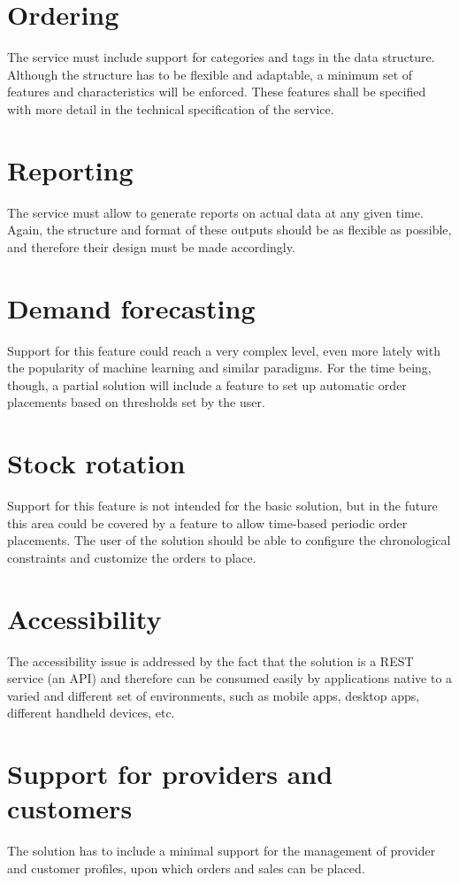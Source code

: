 \section{Ordering}
The service must include support for categories and tags in the data structure. Although the structure has to be flexible and adaptable, a minimum set of features and characteristics will be enforced. These features shall be specified with more detail in the technical specification of the service.
\section{Reporting}
The service must allow to generate reports on actual data at any given time. Again, the structure and format of these outputs should be as flexible as possible, and therefore their design must be made accordingly.
\section{Demand forecasting}
Support for this feature could reach a very complex level, even more lately with the popularity of machine learning and similar paradigms. For the time being, though, a partial solution will include a feature to set up automatic order placements based on thresholds set by the user.
\section{Stock rotation}
Support for this feature is not intended for the basic solution, but in the future this area could be covered by a feature to allow time-based periodic order placements. The user of the solution should be able to configure the chronological constraints and customize the orders to place.
\section{Accessibility}
The accessibility issue is addressed by the fact that the solution is a REST service (an API) and therefore can be consumed easily by applications native to a varied and different set of environments, such as mobile apps, desktop apps, different handheld devices, etc.
\section{Support for providers and customers}
The solution has to include a minimal support for the management of provider and customer profiles, upon which orders and sales can be placed.

